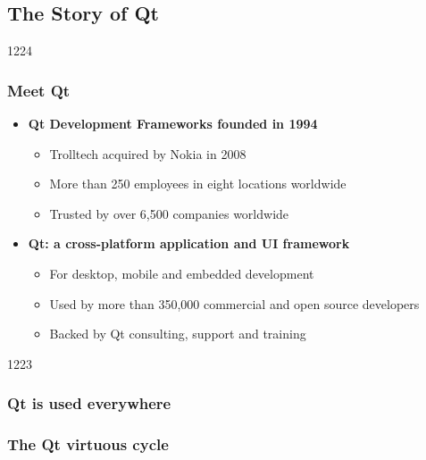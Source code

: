%
%
%
%

\subsection{The Story of Qt}

\begin{slide}{1224}
  \frametitle{Meet Qt}
  \begin{itemize}
  \item \textbf{Qt Development Frameworks founded in 1994}
    \begin{itemize}
   \item Trolltech acquired by Nokia in 2008
    \item More than 250 employees in eight locations worldwide
    \item Trusted by over 6,500 companies worldwide
    \end{itemize}
  \item \textbf{Qt: a cross-platform application and UI framework}
    \begin{itemize}
    \item For desktop, mobile and embedded development
    \item Used by more than 350,000 commercial and open source developers
    \item Backed by Qt consulting, support and training
    \end{itemize}
 \end{itemize}
 \vfill
\end{slide}

\begin{slide}{1223}
  \frametitle{Qt is used everywhere}
  \hspace*{0.025\pdfpagewidth}
\end{slide}

\begin{slide}
  \frametitle{The Qt virtuous cycle}
   \\
  \medskip
\end{slide}

